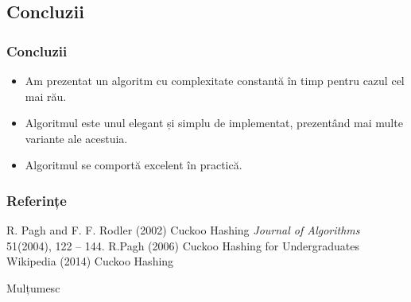 \documentclass{beamer}
\begin{document}
\begin{frame}
\section{Concluzii}
\frametitle{Concluzii}
\begin{itemize}

\item Am prezentat un algoritm cu complexitate constantă în timp pentru cazul cel mai rău.

\item Algoritmul este unul elegant și simplu de implementat, prezentând mai multe variante ale acestuia.

\item Algoritmul se comportă excelent în practică.

\end{itemize}
\end{frame}

\begin{frame}
\frametitle{Referințe}
\footnotesize{
\begin{thebibliography}{99} %
  R. Pagh and F. F. Rodler (2002)
\newblock Cuckoo Hashing
\newblock \emph{Journal of Algorithms} 51(2004), 122 -- 144.
 R.Pagh (2006)
\newblock Cuckoo Hashing for Undergraduates
 Wikipedia (2014)
\newblock Cuckoo Hashing
\end{thebibliography}
}
\end{frame}


\begin{frame}
\Huge{\centerline{Mulțumesc}}
\end{frame}

\end{document}
